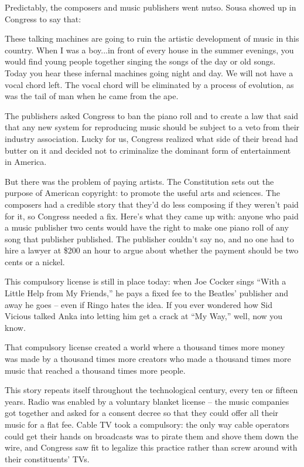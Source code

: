 Predictably, the composers and music publishers went nutso. Sousa
showed up in Congress to say that:

These talking machines are going to ruin the artistic development
of music in this country. When I was a boy...in front of every
house in the summer evenings, you would find young people together
singing the songs of the day or old songs. Today you hear these
infernal machines going night and day. We will not have a vocal
chord left. The vocal chord will be eliminated by a process of
evolution, as was the tail of man when he came from the ape.

The publishers asked Congress to ban the piano roll and to create a
law that said that any new system for reproducing music should be
subject to a veto from their industry association. Lucky for us,
Congress realized what side of their bread had butter on it and
decided not to criminalize the dominant form of entertainment in
America.

But there was the problem of paying artists. The Constitution sets
out the purpose of American copyright: to promote the useful arts
and sciences. The composers had a credible story that they'd do
less composing if they weren't paid for it, so Congress needed a
fix. Here's what they came up with: anyone who paid a music
publisher two cents would have the right to make one piano roll of
any song that publisher published. The publisher couldn't say no,
and no one had to hire a lawyer at \$200 an hour to argue about
whether the payment should be two cents or a nickel.

This compulsory license is still in place today: when Joe Cocker
sings ``With a Little Help from My Friends,'' he pays a fixed fee to
the Beatles' publisher and away he goes -- even if Ringo hates the
idea. If you ever wondered how Sid Vicious talked Anka into letting
him get a crack at ``My Way,'' well, now you know.

That compulsory license created a world where a thousand times more
money was made by a thousand times more creators who made a
thousand times more music that reached a thousand times more
people.

This story repeats itself throughout the technological century,
every ten or fifteen years. Radio was enabled by a voluntary
blanket license -- the music companies got together and asked for a
consent decree so that they could offer all their music for a flat
fee. Cable TV took a compulsory: the only way cable operators could
get their hands on broadcasts was to pirate them and shove them
down the wire, and Congress saw fit to legalize this practice
rather than screw around with their constituents' TVs.

